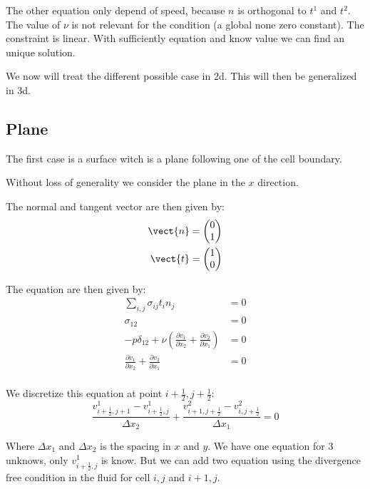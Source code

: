 The other equation only depend of speed, because $n$ is orthogonal to $t^{1}$ and $t^{2}$.
The value of $\nu$ is not relevant for the condition (a global none zero constant).
The constraint is linear. With sufficiently equation and know value we can find an unique solution.

We now will treat the different possible case in 2d. This will then be generalized in 3d.

\subsection{Plane}

The first case is a surface witch is a plane following one of the cell boundary.

Without loss of generality we consider the plane in the $x$ direction.

The normal and tangent vector are then given by:
\begin{align}
	\vect{n}&=\begin{pmatrix}
	         	0\\
	         	1
	         \end{pmatrix}\\
	\vect{t}&=\begin{pmatrix}
	          	1\\
	          	0
	          \end{pmatrix}
\end{align}

The equation are then given by:
\begin{align}
	\sum_{i,j}\sigma_{ij}t_{i}n_{j}&=0\\
	\sigma_{12}&=0\\
	-p \delta_{12}+\nu\left(\frac{\partial v_{1}}{\partial x_{2}}+\frac{\partial v_{2}}{\partial x_{1}}\right)&=0\\
	\frac{\partial v_{1}}{\partial x_{2}}+\frac{\partial v_{2}}{\partial x_{1}}&=0\\
\end{align}

We discretize this equation at point $i+\frac{1}{2},j+\frac{1}{2}$:
\begin{equation}
\label{var:extr:droitCont}
	\frac{v^{1}_{i+\frac{1}{2},j+1}-v^{1}_{i+\frac{1}{2},j}}{\Delta x_{2}}+\frac{v^{2}_{i+1,j+\frac{1}{2}}-v^{2}_{i,j+\frac{1}{2}}}{\Delta x_{1}}=0
\end{equation}

Where $\Delta x_{1}$ and $\Delta x_{2}$ is the spacing in $x$ and $y$.
We have one equation for 3 unknows, only $v^{1}_{i+\frac{1}{2},j}$ is know.
But we can add two equation using the divergence free condition in the fluid for cell $i,j$ and $i+1,j$.

